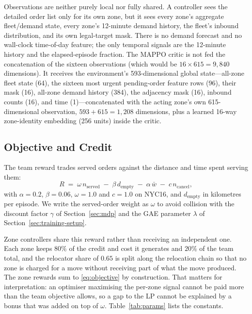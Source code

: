 \documentclass[conference]{IEEEtran}
\begin{document}
Observations are neither purely local nor fully shared. A controller sees the
detailed order list only for its own zone, but it sees every zone's aggregate
fleet/demand state, every zone's 12-minute demand history, the fleet's inbound
distribution, and its own legal-target mask. There is no demand forecast and no
wall-clock time-of-day feature; the only temporal signals are the 12-minute
history and the elapsed-episode fraction. The MAPPO critic is not fed the
concatenation of the sixteen observations (which would be
$16\times615=9{,}840$ dimensions). It receives the environment's
593-dimensional global state---all-zone fleet state (64), the sixteen most
urgent pending-order feature rows (96), their mask (16), all-zone demand
history (384), the adjacency mask (16), inbound counts (16), and time
(1)---concatenated with the acting zone's own 615-dimensional observation,
$593+615=1{,}208$ dimensions, plus a learned 16-way zone-identity embedding
(256 units) inside the critic.

\subsection{Objective and Credit}
\label{sec:objective}

The team reward trades served orders against the distance and time spent
serving them:
\begin{equation}
  R \;=\; \omega\, n_{\mathrm{served}}
      \;-\; \beta\, d_{\mathrm{empty}}
      \;-\; \alpha\, \bar{w}
      \;-\; c\, n_{\mathrm{cancel}},
  \label{eq:objective}
\end{equation}
with $\alpha=0.2$, $\beta=0.06$, $\omega=1.0$ and $c=1.0$ on NYC16, and
$d_{\mathrm{empty}}$ in kilometres per episode. We write the served-order
weight as $\omega$ to avoid collision with the discount factor $\gamma$ of
Section~\ref{sec:mdp} and the GAE parameter $\lambda$ of
Section~\ref{sec:training-setup}.

Zone controllers share this reward rather than receiving an independent one.
Each zone keeps $80\%$ of the credit and cost it generates and $20\%$ of the
team total, and the relocator share of $0.65$ is split along the relocation
chain so that no zone is charged for a move without receiving part of what the
move produced. The zone rewards sum to \eqref{eq:objective} by construction.
That matters for interpretation: an optimiser maximising the per-zone signal
cannot be paid more than the team objective allows, so a gap to the LP cannot
be explained by a bonus that was added on top of $\omega$.
Table~\ref{tab:params} lists the constants.
\end{document}
